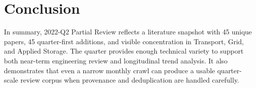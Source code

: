 \documentclass[conference]{IEEEtran}
\begin{document}
\section{Conclusion}
In summary, 2022-Q2 Partial Review reflects a literature snapshot with 45 unique papers, 45 quarter-first additions, and visible concentration in Transport, Grid, and Applied Storage. The quarter provides enough technical variety to support both near-term engineering review and longitudinal trend analysis. It also demonstrates that even a narrow monthly crawl can produce a usable quarter-scale review corpus when provenance and deduplication are handled carefully.



\end{document}
